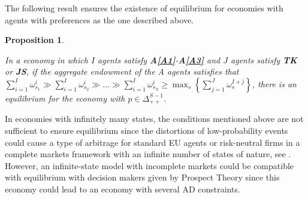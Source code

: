 \documentclass[pdftex]{article}
\numberwithin{equation}{section}
\theoremstyle{th}
\newtheorem{prop}{{Proposition}}%
\newtheorem{proof lemma}{{Proof Lemma}.}
\theoremstyle{definition}
\newtheorem{remark}{Remark}%
\begin{document}
{The following result ensures the existence of equilibrium for economies with agents with preferences as the one described above. %


\begin{prop}
\label{exisFS}

In a economy in which $I$ agents satisfy \textbf{A\ref{A1}}-\textbf{A\ref{A3}} and $J$ agents satisfy \textbf{TK} or \textbf{JS}, if the aggregate endowment of the A agents satisfies that $\sum_{i=1}^{I}\omega_{s_{1}}^{i}\gg\sum_{i=1}^{I}\omega_{s_{2}}^{i}\gg\dots\gg\sum_{i=1}^{I}\omega_{s_{S}}^{i}\geq\max_s\left\{\sum_{j=1}^{J}\omega_{s}^{I+j}\right\}$, there is an equilibrium for the economy with $p\in\Delta_{++}^{S-1}$. 

\end{prop}




In economies with infinitely many states, the conditions mentioned above are not sufficient to ensure equilibrium since the distortions of low-probability events could cause a type of arbitrage for standard EU agents or risk-neutral firms in a complete markets framework with an infinite number of states of nature,  see \cite{AG}. However, an infinite-state model with incomplete markets could be compatible with equilibrium with decision makers given by Prospect Theory since this economy could lead to an economy with several AD constraints.





}
\end{document}

